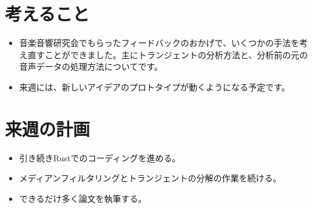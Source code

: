\documentclass[a4paper, 12pt]{article}
\begin{document}
\section*{考えること}
\begin{itemize}
    \item 音楽音響研究会でもらったフィードバックのおかげで、いくつかの手法を考え直すことができました。主にトランジェントの分析方法と、分析前の元の音声データの処理方法についてです。
    \item 来週には、新しいアイデアのプロトタイプが動くようになる予定です。
\end{itemize}

\section*{来週の計画}
\begin{itemize}
    \item 引き続きRustでのコーディングを進める。
    \item メディアンフィルタリングとトランジェントの分解の作業を続ける。
    \item できるだけ多く論文を執筆する。
\end{itemize}


\printbibliography
\end{document}
